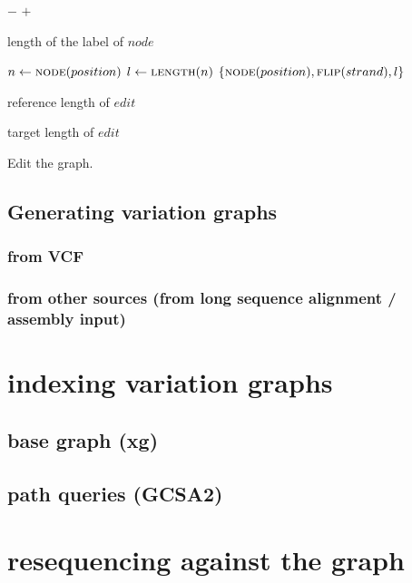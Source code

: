 \documentclass{article}
\begin{document}
\begin{algorithm}
\begin{algorithmic}
    \Return $-$
    \Else{}
    \Return $+$
    \EndIf
    \EndFunction

    \Return length of the label of $node$
    \EndFunction

    \State $n \gets \Call{node}{position}$
    \State $l \gets \Call{length}{n}$
    \Return $\{ \Call{node}{position}, \Call{flip}{strand}, l \}$
    \EndFunction

    \Return reference length of $edit$
    \EndFunction

    \Return target length of $edit$
    \EndFunction

  \end{algorithmic}
  \caption{Edit the graph.}
\end{algorithm}


\subsection{Generating variation graphs}

\subsubsection{from VCF}

\subsubsection{from other sources (from long sequence alignment / assembly input)}


\section{indexing variation graphs}

\subsection{base graph (xg)}

\subsection{path queries (GCSA2)}


\section{resequencing against the graph}
\end{document}
